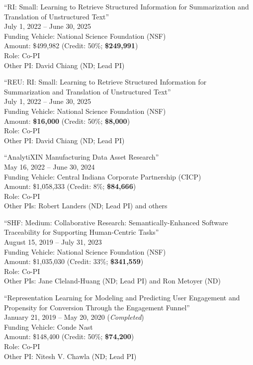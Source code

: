 \documentclass[10pt]{article}
\newenvironment{myindentpar}[1]%
{\begin{list}{}%
         {\setlength{\leftmargin}{#1}}%
         \item[]%
}
{\end{list}}
\newcounter{list}
\begin{document}
\begin{myindentpar}{0.75cm}
\hspace{-0.75cm}``RI: Small: Learning to Retrieve Structured Information for Summarization and Translation of Unstructured Text'' \\
July 1, 2022 -- June 30, 2025 \\
Funding Vehicle: National Science Foundation (NSF) \\
Amount: \$499,982 (Credit: 50\%; \textbf{\$249,991}) \\
Role: {Co-PI} \\
Other PI: David Chiang (ND; Lead PI)

\hspace{-0.75cm}``REU: RI: Small: Learning to Retrieve Structured Information for Summarization and Translation of Unstructured Text'' \\
July 1, 2022 -- June 30, 2025 \\
Funding Vehicle: National Science Foundation (NSF) \\
Amount: \textbf{\$16,000} (Credit: 50\%; \textbf{\$8,000}) \\
Role: {Co-PI} \\
Other PI: David Chiang (ND; Lead PI)

\hspace{-0.75cm}``AnalytiXIN Manufacturing Data Asset Research'' \\
May 16, 2022 -- June 30, 2024 \\
Funding Vehicle: Central Indiana Corporate Partnership (CICP) \\
Amount: \$1,058,333 (Credit: 8\%; \textbf{\$84,666}) \\
Role: {Co-PI} \\
Other PIs: Robert Landers (ND; Lead PI) and others

\hspace{-0.75cm}``SHF: Medium: Collaborative Research: Semantically-Enhanced Software Traceability for Supporting Human-Centric Tasks'' \\
August 15, 2019 -- July 31, 2023 \\
Funding Vehicle: National Science Foundation (NSF) \\
Amount: \$1,035,030 (Credit: 33\%; \textbf{\$341,559}) \\
Role: {Co-PI} \\
Other PIs: Jane Cleland-Huang (ND; Lead PI) and Ron Metoyer (ND)

\hspace{-0.75cm}``Representation Learning for Modeling and Predicting User Engagement and Propensity for Conversion Through the Engagement Funnel'' \\
January 21, 2019 -- May 20, 2020 (\emph{Completed}) \\
Funding Vehicle: Conde Nast \\
Amount: \$148,400 (Credit: 50\%; \textbf{\$74,200}) \\
Role: {Co-PI} \\
Other PI: Nitesh V. Chawla (ND; Lead PI)


\end{myindentpar}
\end{document}
